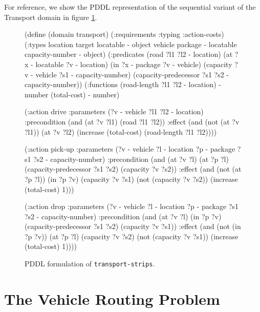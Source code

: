 For reference, we show the PDDL representation of the sequential variant of
the Transport domain in figure \ref{code:pddl-strips}.

\begin{figure}[htb]
\begin{code}
(define (domain transport)
  (:requirements :typing :action-costs)
  (:types
        location target locatable - object
        vehicle package - locatable
        capacity-number - object)
  (:predicates 
     (road ?l1 ?l2 - location)
     (at ?x - locatable ?v - location)
     (in ?x - package ?v - vehicle)
     (capacity ?v - vehicle ?s1 - capacity-number)
     (capacity-predecessor ?s1 ?s2 - capacity-number))
  (:functions
     (road-length ?l1 ?l2 - location) - number
     (total-cost) - number)
     
  (:action drive
    :parameters (?v - vehicle ?l1 ?l2 - location)
    :precondition (and (at ?v ?l1) (road ?l1 ?l2))
    :effect (and (not (at ?v ?l1)) (at ?v ?l2)
        (increase (total-cost) (road-length ?l1 ?l2))))
        
 (:action pick-up
    :parameters (?v - vehicle ?l - location ?p - package
                 ?s1 ?s2 - capacity-number)
    :precondition (and (at ?v ?l) (at ?p ?l)
        (capacity-predecessor ?s1 ?s2) (capacity ?v ?s2))
    :effect (and (not (at ?p ?l)) (in ?p ?v) (capacity ?v ?s1)
        (not (capacity ?v ?s2)) (increase (total-cost) 1)))
        
  (:action drop
    :parameters (?v - vehicle ?l - location ?p - package
                 ?s1 ?s2 - capacity-number)
    :precondition (and (at ?v ?l) (in ?p ?v)
        (capacity-predecessor ?s1 ?s2) (capacity ?v ?s1))
    :effect (and (not (in ?p ?v)) (at ?p ?l) (capacity ?v ?s2)
        (not (capacity ?v ?s1)) (increase (total-cost) 1))))
\end{code}
\caption{PDDL formulation of \texttt{transport-strips}.}
\label{code:pddl-strips}
\end{figure}





\section{The Vehicle Routing Problem}

 \cite{Dantzig1959}

 \cite{Braekers2016}

 \cite{Montoya2015}

